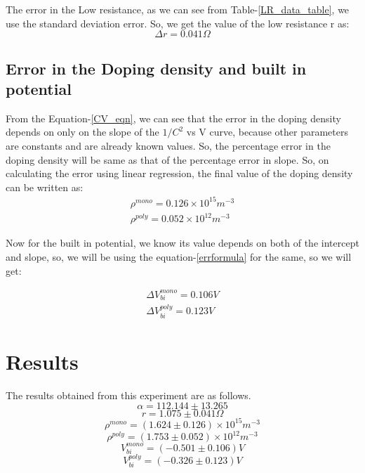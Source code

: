 \documentclass{article}
\begin{document}
\begin{multicols}{2}
The error in the Low resistance, as we can see from Table-\ref{LR_data_table}, we use the standard deviation error. So, we get the value of the low resistance r as:
\begin{equation}
    \Delta r = 0.041 \Omega
\end{equation}

\subsection{Error in the Doping density and built in potential}

From the Equation-\ref{CV_eqn}, we can see that the error in the doping density depends on only on the slope of the $1/C^2$ vs V curve, because other parameters are constants and are already known values. So, the percentage error in the doping density will be same as that of the percentage error in slope. So, on calculating the error using linear regression, the final value of the doping density can be written as:
\begin{eqnarray}
    \rho^{mono} = 0.126 \times 10^{15} m^{-3} \\
    \rho^{poly} = 0.052 \times 10^{12} m^{-3}
\end{eqnarray}

Now for the built in potential, we know its value depends on both of the intercept and slope, so, we will be using the equation-\ref{errformula} for the same, so we will get:

\begin{eqnarray}
    \Delta V_{bi}^{mono} = 0.106V \\
    \Delta V_{bi}^{poly} = 0.123V
\end{eqnarray}



\section{Results}
The results obtained from this experiment are as follows.
\begin{equation}
    \alpha  = 112.144 \pm 13.265
\end{equation}
\begin{equation}    
    r=1.075 \pm 0.041 \Omega
\end{equation}
\begin{equation}
    \rho^{mono} = (1.624 \pm 0.126) \times 10^{15} m^{-3}
\end{equation}
\begin{equation}
    \rho^{poly} = (1.753 \pm 0.052) \times 10^{12} m^{-3}
\end{equation}
\begin{equation}
    V_{bi}^{mono} = (-0.501 \pm 0.106) V
\end{equation}
\begin{equation}
    V_{bi}^{poly} = (-0.326 \pm 0.123) V
\end{equation}


\end{multicols}
\end{document}
